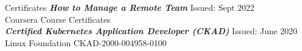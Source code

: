 \begin{section}{Certificates}
    {\sl \textbf{How to Manage a Remote Team}} \hfill Issued: Sept 2022\\
    Coursera Course Certificates \\
    {\sl \textbf{Certified Kubernetes Application Developer (CKAD)}} \hfill Issued: June 2020\\
    Linux Foundation \hfill CKAD-2000-004958-0100 \\
\end{section}